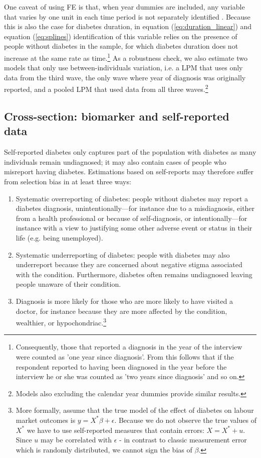 One caveat of using \ac{FE} is that, when year dummies are included, any variable that varies by one unit in each time period is not separately identified \parencite{Wooldridge2012}. Because this is also the case for diabetes duration, in equation (\ref{eq:duration_linear}) and equation (\ref{eq:splines}) identification of this variable relies on the presence of people without diabetes in the sample, for which diabetes duration does not increase at the same rate as time.\footnote{Consequently, those that reported a diagnosis in the year of the interview were counted as 'one year since diagnosis'. From this follows that if the respondent reported to having been diagnosed in the year before the interview he or she was counted as 'two years since diagnosis' and so on.} As a robustness check, we also estimate two models that only use between-individuals variation, i.e. a \ac{LPM} that uses only data from the third wave, the only wave where year of diagnosis was originally reported, and a pooled \ac{LPM} that used data from all three waves.\footnote{Models also excluding the calendar year dummies provide similar results.}

\subsection{\label{sec:Biomarker Strategy}Cross-section: biomarker and self-reported data}

Self-reported diabetes only captures part of the population with diabetes as many individuals remain undiagnosed; it may also contain cases of people who misreport having diabetes.  Estimations based on self-reports may therefore suffer from selection bias in at least three ways:

\begin{enumerate}
\item Systematic overreporting of diabetes: people without diabetes
may report a diabetes diagnosis, unintentionally---for instance due to a misdiagnosis, either from a health professional or because of self-diagnosis, or intentionally---for instance with a view to justifying some other adverse event or status in their life (e.g. being unemployed). 
\item Systematic underreporting of diabetes: people with diabetes may also underreport because they are concerned about negative stigma associated with the condition. Furthermore, diabetes often remains undiagnosed leaving people unaware of their condition.
\item Diagnosis is more likely for those who are more likely to have visited a doctor, for instance because they are more affected by the condition, wealthier, or hypochondriac.\footnote{More formally, assume that the true model of the effect of diabetes on labour market outcomes is $y=X^{*}\beta+\epsilon$. Because we do not observe the true values of  $X^{*}$  we have to use self-reported measures that contain errors: $X=X^{*} + u$. Since $u$ may be correlated with $\epsilon$ - in contrast to classic measurement error which is randomly distributed, we cannot sign the bias of  $\beta$.}    
\end{enumerate} 

